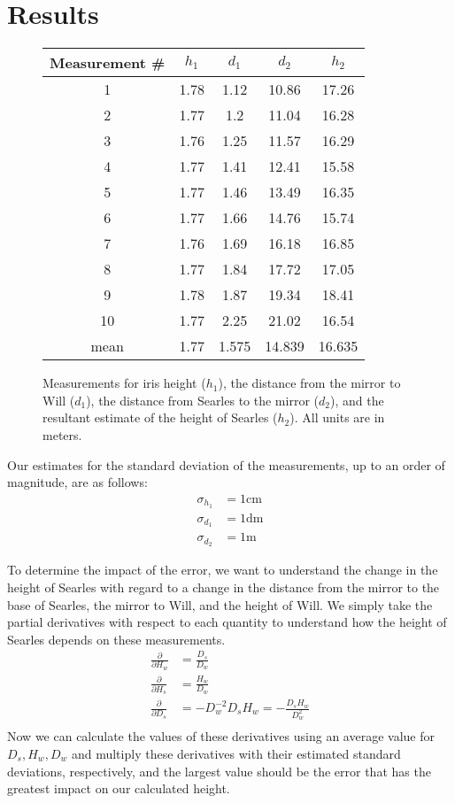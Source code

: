 \documentclass[11pt]{article}
\begin{document}
\section{Results}
\begin{figure}
\centering
\begin{tabular}{ccccc}
\toprule
Measurement \# & $h_1$ & $d_1$ & $d_2$ & $h_2$ \\
\midrule
1 & 1.78 & 1.12 & 10.86 & 17.26 \\
2 & 1.77 & 1.2 & 11.04 & 16.28 \\
3 & 1.76 & 1.25 & 11.57 & 16.29 \\
4 & 1.77 & 1.41 & 12.41 & 15.58 \\
5 & 1.77 & 1.46 & 13.49 & 16.35 \\
6 & 1.77 & 1.66 & 14.76 & 15.74 \\
7 & 1.76 & 1.69 & 16.18 & 16.85 \\
8 & 1.77 & 1.84 & 17.72 & 17.05 \\
9 & 1.78 & 1.87 & 19.34 & 18.41 \\
10 & 1.77 & 2.25 & 21.02 & 16.54 \\
\midrule
mean & 1.77 & 1.575 & 14.839 & 16.635 \\
\bottomrule
\end{tabular}
\caption{Measurements for iris height ($h_1$), the distance from the mirror to Will ($d_1$), the distance from Searles to the mirror ($d_2$), and the resultant estimate of the height of Searles ($h_2$). All units are in meters.}
\end{figure}
Our estimates for the standard deviation of the measurements, up to an order of magnitude, are as follows:
\begin{align*}
\sigma_{h_1} &= 1\text{cm} \\
\sigma_{d_1} &= 1\text{dm} \\
\sigma_{d_2} &= 1\text{m}
\end{align*}

To determine the impact of the error, we want to understand the change in the height of Searles with regard to a change in the distance from the mirror to the base of Searles, the mirror to Will, and the height of Will. We simply take the partial derivatives with respect to each quantity to understand how the height of Searles depends on these measurements. \\
\begin{align*}
    \frac{\partial}{\partial H_w} &= \frac{D_s}{D_w} \\
	\frac{\partial}{\partial H_s} &= \frac{H_w}{D_w} \\
	\frac{\partial}{\partial D_s} &= -D_w^{-2}D_sH_w = -\frac{D_sH_w}{D_w^2} \\
\end{align*}
Now we can calculate the values of these derivatives using an average value for $D_s, H_w, D_w$ and multiply these derivatives with their estimated standard deviations, respectively, and the largest value should be the error that has the greatest impact on our calculated height.
\end{document}

